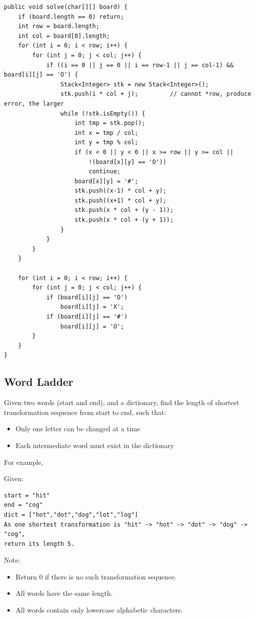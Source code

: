 \documentclass[12pt]{book}
\begin{document}
\lstset{language=java,label= ,caption= ,numbers=none}
\begin{lstlisting}
public void solve(char[][] board) {
    if (board.length == 0) return;
    int row = board.length;
    int col = board[0].length;
    for (int i = 0; i < row; i++) {
        for (int j = 0; j < col; j++) {
            if ((i == 0 || j == 0 || i == row-1 || j == col-1) && board[i][j] == 'O') {
                Stack<Integer> stk = new Stack<Integer>();
                stk.push(i * col + j);         // cannot *row, produce error, the larger 
                while (!stk.isEmpty()) {
                    int tmp = stk.pop();
                    int x = tmp / col;
                    int y = tmp % col;
                    if (x < 0 || y < 0 || x >= row || y >= col ||
                        !(board[x][y] == 'O'))
                        continue;
                    board[x][y] = '#';
                    stk.push((x-1) * col + y);
                    stk.push((x+1) * col + y);
                    stk.push(x * col + (y - 1));
                    stk.push(x * col + (y + 1));
                }
            }
        }
    }
            
    for (int i = 0; i < row; i++) {
        for (int j = 0; j < col; j++) {
            if (board[i][j] == 'O')
                board[i][j] = 'X';
            if (board[i][j] == '#')
                board[i][j] = 'O';
        }
    }
}
\end{lstlisting}

\subsection{Word Ladder}
\label{sec-10-1-2}
Given two words (start and end), and a dictionary, find the length of shortest transformation sequence from start to end, such that:
\begin{itemize}
\item Only one letter can be changed at a time
\item Each intermediate word must exist in the dictionary
\end{itemize}
For example,

Given:
\lstset{language=java,label= ,caption= ,numbers=none}
\begin{lstlisting}
start = "hit"
end = "cog"
dict = ["hot","dot","dog","lot","log"]
As one shortest transformation is "hit" -> "hot" -> "dot" -> "dog" -> "cog",
return its length 5.
\end{lstlisting}
Note:
\begin{itemize}
\item Return 0 if there is no such transformation sequence.
\item All words have the same length.
\item All words contain only lowercase alphabetic characters.
\end{itemize}
\end{document}
